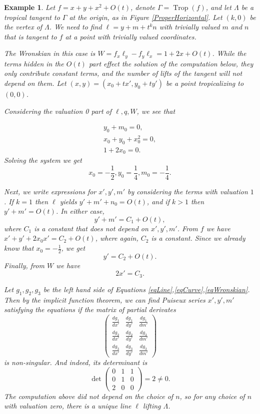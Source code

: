 \documentclass[oneside]{amsart}
\DeclareMathOperator{\trop}{Trop}
\newtheorem{example}[thm]{Example}
\theoremstyle{definition}
\begin{document}
\begin{example}\label{ex:properIntersection}
Let $f = x+y+x^2+O(t)$, denote $\Gamma = \trop(f)$, and let $\Lambda$ be a tropical tangent to $\Gamma$ at the origin, as in Figure \ref{ProperHorizontal}. Let $(k,0)$ be the vertex of $\Lambda$. We need to find $\ell = y+m+t^kn$ with  trivially valued $m$ and $n$ that is tangent to $f$ at a point with trivially valued coordinates. 

The Wronskian in this case is $W= f_x\ell_y - f_y\ell_x = 1+2x+ O(t)$. While the terms hidden in the $O(t)$ part effect the solution of the computation below, they only contribute constant terms, and the number of lifts of the tangent will not depend on them. Let $(x,y) = (x_0+tx', y_0+ty')$ be a point tropicalizing to $(0,0)$. 

Considering the valuation 0 part of $\ell,q,W$, we see that 

\begin{gather*}
y_0 + m_0 = 0,\\
x_0+y_0 + x_0^2 = 0,\\
1+2x_0 = 0.
\end{gather*}
Solving the system we get
\[x_0 = -\frac{1}{2}, y_0 = \frac{1}{4}, m_0 = -\frac{1}{4}. \]

Next, we write expressions for $x',y',m'$ by considering the terms with valuation $1$. If $k=1$ then $\ell$ yields $y'+m'+n_0 = O(t)$, and if $k>1$ then $y'+m'=O(t)$. In either case,  
\begin{equation}\label{eqLine}
y'+m'=C_1+O(t),
\end{equation}
where $C_1$ is a constant that does not depend on $x',y',m'$.  
From $f$ we have 
$x' + y' + 2x_0x' = C_2 +  O(t)$, where again, $C_2$ is a constant. Since we already know that $x_0 = -\frac{1}{2}$, we get 
\begin{equation}\label{eqCurve}
y' = C_2 + O(t).
\end{equation}
Finally, from $W$ we have  
\begin{equation}\label{eqWronskian}
2x' = C_3.
\end{equation}

Let $g_1,g_2,g_3$ be the left hand side of Equations \ref{eqLine},\ref{eqCurve},\ref{eqWronskian}. Then by the implicit function theorem, we can find Puiseux series $x',y',m'$ satisfying the equations if  the matrix of partial derivates
\[
\begin{pmatrix}
  \frac{dg_1}{dx'} & \frac{dg_1}{dy'} & \frac{dg_1}{dm'} \\
  \frac{dg_2}{dx'} & \frac{dg_2}{dy'} & \frac{dg_3}{dm'} \\
  \frac{dg_3}{dx'} & \frac{dg_3}{dy'} & \frac{dg_3}{dm'}
 \end{pmatrix} 
 \]
 is non-singular. And indeed, its determinant is 
\[
\det\begin{pmatrix}
  0 & 1 & 1 \\
  0 & 1 & 0 \\
  2 & 0 & 0
 \end{pmatrix} = 2 \neq 0.
 \]
The computation above did not depend on the choice of $n$, so for any choice of $n$ with valuation zero, there is a unique line $\ell$ lifting $\Lambda$. 



\end{example}
\end{document}
